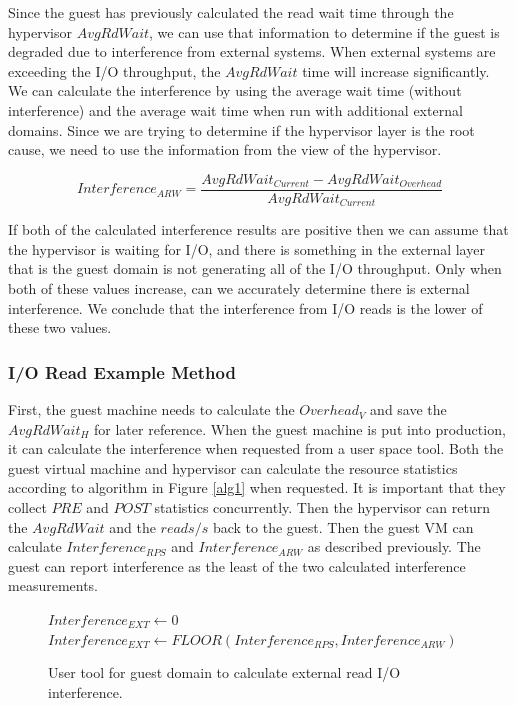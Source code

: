 Since the guest has previously calculated the read wait time through the hypervisor $AvgRdWait$, we can use that information to determine if the guest is degraded due to interference from external systems.  When external systems are exceeding the I/O throughput, the $AvgRdWait$ time will increase significantly.  We can calculate the interference by using the average wait time (without interference) and the average wait time when run with additional external domains.  Since we are trying to determine if the hypervisor layer is the root cause, we need to use the information from the view of the hypervisor.

\begin{equation}
	Interference_{ARW} = \frac{AvgRdWait_{Current} - AvgRdWait_{Overhead}}{AvgRdWait_{Current}} 
\end{equation}

If both of the calculated interference results are positive then we can assume that the hypervisor is waiting for I/O, and there is something in the external layer that is the guest domain is not generating all of the I/O throughput.
Only when both of these values increase, can we accurately determine there is external interference.
We conclude that the interference from I/O reads is the lower of these two values.

\subsubsection{I/O Read Example Method}
First, the guest machine needs to calculate the $Overhead_V$ and save the $AvgRdWait_H$ for later reference.  When the guest machine is put into production, it can calculate the interference when requested from a user space tool.  Both the guest virtual machine and hypervisor can calculate the resource statistics according to algorithm in Figure \ref{alg1} when requested.  It is important that they collect $PRE$ and $POST$ statistics concurrently.  Then the hypervisor can return the $AvgRdWait$ and the $reads/s$ back to the guest.  Then the guest VM can calculate $Interference_{RPS}$ and $Interference_{ARW}$ as described previously.  The guest can report interference as the least of the two calculated interference measurements.

\begin{figure}[h]
\begin{algorithmic}[H]
 \STATE $Interference_{EXT} \gets 0$
 	\STATE $Interference_{EXT} \gets FLOOR(Interference_{RPS}, Interference_{ARW})$  
 \ENDIF
\end{algorithmic}
\label{alg2}
\caption{User tool for guest domain to calculate external read I/O interference.}
\end{figure}

